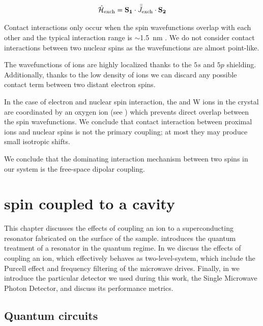 \begin{equation}
    \hat{\mathcal{H}}_{\text{exch}} = \mathbf{S_1} \cdot \bar{\bar {J}}_\text{exch} \cdot \mathbf{S_2}
\end{equation}

Contact interactions only occur when the spin wavefunctions overlap with each other and the typical interaction range is $\sim$1.5~nm . We do not consider contact interactions between two nuclear spins as the wavefunctions are almost point-like.

The wavefunctions of \Er ions are highly localized thanks to the $5s$ and $5p$ shielding. Additionally, thanks to the low density of \Er ions we can discard any possible contact term between two distant electron spins. 

In the case of electron and nuclear spin interaction, the \Er and W ions in the crystal are coordinated by an oxygen ion (see ) which prevents direct overlap between the spin wavefunctions. We conclude that contact interaction between proximal \Er ions and \W nuclear spins is not the primary coupling; at most they may produce small isotropic shifts.

We conclude that the dominating interaction mechanism between two spins in our system is the free-space dipolar coupling.

\setchapterpreamble[u]{\margintoc}
\chapter[Er3+ spin coupled to a microwave resonator]{\Er spin coupled to a cavity}

This chapter discusses the effects of coupling an \Er ion to a superconducting resonator fabricated on the surface of the \Ca sample.  introduces the quantum treatment of a resonator in the quantum regime. In  we discuss the effects of coupling an \Er ion, which effectively behaves as two-level-system, which include the Purcell effect and frequency filtering of the microwave drives. Finally, in  we introduce the particular detector we used during this work, the Single Microwave Photon Detector, and discuss its performance metrics.

\section{Quantum circuits}

